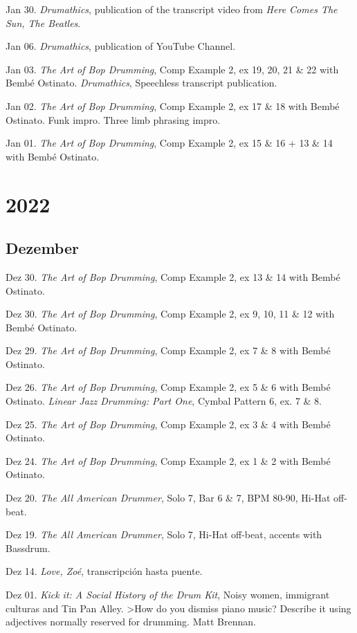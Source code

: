 \documentclass[
]{book}
\begin{document}
Jan 30. \emph{Drumathics}, publication of the transcript video from \emph{Here Comes The Sun, The Beatles}.

Jan 06. \emph{Drumathics}, publication of YouTube Channel.

Jan 03. \emph{The Art of Bop Drumming}, Comp Example 2, ex 19, 20, 21 \& 22 with Bembé Ostinato. \emph{Drumathics}, Speechless transcript publication.

Jan 02. \emph{The Art of Bop Drumming}, Comp Example 2, ex 17 \& 18 with Bembé Ostinato. Funk impro. Three limb phrasing impro.

Jan 01. \emph{The Art of Bop Drumming}, Comp Example 2, ex 15 \& 16 + 13 \& 14 with Bembé Ostinato.

\section*{2022}\label{diary-2022}

\subsection*{Dezember}\label{dezember-2022}

Dez 30. \emph{The Art of Bop Drumming}, Comp Example 2, ex 13 \& 14 with Bembé Ostinato.

Dez 30. \emph{The Art of Bop Drumming}, Comp Example 2, ex 9, 10, 11 \& 12 with Bembé Ostinato.

Dez 29. \emph{The Art of Bop Drumming}, Comp Example 2, ex 7 \& 8 with Bembé Ostinato.

Dez 26. \emph{The Art of Bop Drumming}, Comp Example 2, ex 5 \& 6 with Bembé Ostinato. \emph{Linear Jazz Drumming: Part One}, Cymbal Pattern 6, ex. 7 \& 8.

Dez 25. \emph{The Art of Bop Drumming}, Comp Example 2, ex 3 \& 4 with Bembé Ostinato.

Dez 24. \emph{The Art of Bop Drumming}, Comp Example 2, ex 1 \& 2 with Bembé Ostinato.

Dez 20. \emph{The All American Drummer}, Solo 7, Bar 6 \& 7, BPM 80-90, Hi-Hat off-beat.

Dez 19. \emph{The All American Drummer}, Solo 7, Hi-Hat off-beat, accents with Bassdrum.

Dez 14. \emph{Love, Zoé}, transcripción hasta puente.

Dez 01. \emph{Kick it: A Social History of the Drum Kit}, Noisy women, immigrant culturas and Tin Pan Alley.
\textgreater How do you dismiss piano music? Describe it using adjectives normally reserved for drumming. Matt Brennan.
\end{document}
